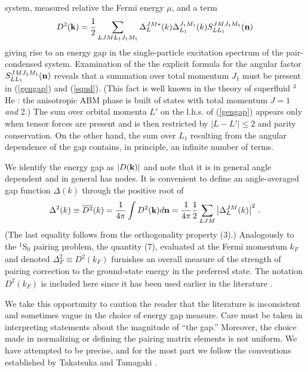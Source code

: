 system, measured relative the Fermi energy $\mu$, and a term
\begin{equation}
 D^2({\bf k})={1\over 2}\sum_{LJML_1J_1M_1}\Delta_L^{JM*}(k)
 \Delta_{L_1}^{J_1M_1}(k) S^{JMJ_1M_1}_{LL_1}({\bf n})
\label{squd}
\end{equation}
giving rise to an energy gap in the single-particle excitation
spectrum of the pair-condensed system.  Examination of the
the explicit formula for the angular factor
$S^{JMJ_1M_1}_{LL_1}({\bf n})$ reveals
that a summation over total momentum $J_1$ must be present in (\ref{gengap})
and (\ref{squd}). (This fact is well known in the theory of superfluid
$^3$He \cite{vol}: the anisotropic ABM phase is built of states with
total momentum $J=1$ {\it and} 2.)  The sum over orbital momenta $L'$ on
the l.h.s. of (\ref{gengap}) appears only when tensor forces
are present and is then restricted by $|L-L'|\leq 2$ and parity
conservation.  On the other hand, the sum over $L_1$ resulting from 
the angular dependence of the gap contains, in principle, an infinite 
number of terms.

We identify the energy gap as $|D({\bf k})|$ and note that
it is in general angle dependent and in general has nodes.  It is
convenient to define an angle-averaged gap function $\Delta(k)$
through the positive root of
\begin{equation}
\Delta^2(k) \equiv {\overline{D^2}}(k)
= \frac1{4\pi} \int  D^2({\bf k})d{\bf n} = 
{1 \over {4\pi}} {1\over 2} \sum_{LJM} \left| \Delta_L^{JM}(k)\right|^2
\, .
\label{aagap}
\end{equation}
(The last equality follows from the orthogonality property (3).)  
Analogously to the $^1$S$_0$ pairing problem, the quantity (7),
evaluated at the Fermi momentum $k_F$ and denoted
$\Delta_F^2\equiv {\overline{D^2}}(k_F)$
furnishes an overall measure of the strength of pairing
correction to the ground-state energy in the preferred state.
The notation ${\overline{D^2}}(k_F)$ is included here since
it has been used earlier in the literature \cite{ttr}.

We take this opportunity to caution the reader that the literature
is inconsistent and sometimes vague in the choice of energy gap measure.  
Care must be taken in interpreting statements about the magnitude of 
``the gap.'' Moreover, the choice made in normalizing or defining the 
pairing matrix elements is not uniform.  We have attempted to be precise,
and for the most part we follow the conventions established by Takatsuka
and Tamagaki \cite{tt71,ttr}.  

